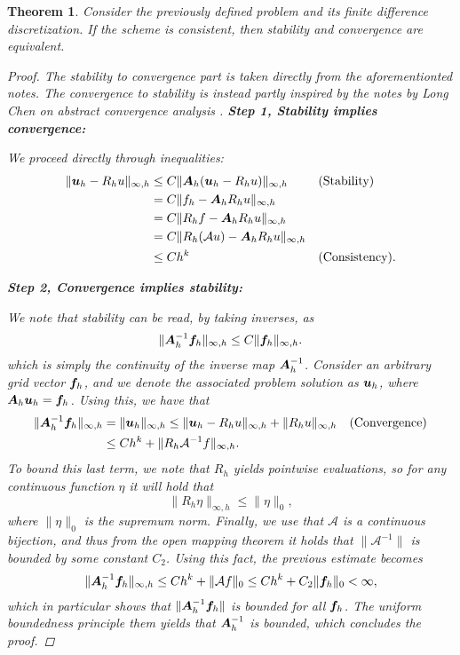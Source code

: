 \documentclass{article}
\renewcommand{\vec}{\vectorsym}
\newcommand{\mat}{\matrixsym}
\newtheorem{theorem}{Theorem}
\begin{document}
\begin{theorem}
    Consider the previously defined problem and its finite difference discretization. If the scheme is consistent, then stability and convergence are equivalent. 
    \begin{proof}
        The stability to convergence part is taken directly from the aforementionted notes. The convergence to stability is instead partly inspired by the notes by Long Chen on abstract convergence analysis \cite{chen2009unified}. 
        {\bf Step 1, Stability implies convergence:}

        We proceed directly through inequalities:
        \begin{align*}
            \| \vec u_h - R_h u\|_{\infty,h} &\leq C\|\mat A_h(\vec u_h - R_hu) \|_{\infty,h} && \text{(Stability)} \\
                                             &=C \| f_h - \mat A_hR_h u \|_{\infty,h} && \\
                                             &=C \| R_h f - \mat A_hR_h u\|_{\infty,h} &&\\
                                             &=C \|R_h(\mathcal A u) - \mat A_hR_h u\|_{\infty,h}&& \\
                                             &\leq Ch^k && \text{(Consistency)}.
        \end{align*}

        {\bf Step 2, Convergence implies stability:}

        We note that stability can be read, by taking inverses, as 
        $$ \| \mat A_h^{-1}\vec f_h \|_{\infty, h} \leq C \|\vec f_h\|_{\infty, h}. $$
        which is simply the continuity of the inverse map $\mat A_h^{-1}$. Consider an arbitrary grid vector $\vec f_h$, and we denote the associated problem solution as $\vec u_h$, where $\mat A_h \vec u_h = \vec f_h$. Using this, we have that
        $$ 
        \begin{aligned} 
            \|\mat A_h^{-1}\vec f_h\|_{\infty,h} &= \| \vec u_h \|_{\infty, h} \leq \| \vec u_h - R_h u \|_{\infty, h} + \| R_h u \|_{\infty, h} && \text{(Convergence)}\\
                                                 &\leq C h^k + \| R_h \mathcal A^{-1} f \|_{\infty, h}. 
        \end{aligned}
        $$
        To bound this last term, we note that $R_h$ yields pointwise evaluations, so for any continuous function $\eta$ it will hold that
        $$ \| R_h \eta \|_{\infty,h} \leq \| \eta \|_0, $$
        where $\| \eta \|_0$ is the supremum norm. Finally, we use that $\mathcal A$ is a continuous bijection, and thus from the open mapping theorem it holds that $\|\mathcal A^{-1}\|$ is bounded by some constant $C_2$. Using this fact, the previous estimate becomes 
        $$ \| \mat A_h^{-1} \vec f_h \|_{\infty,h} \leq Ch^k + \| \mathcal A f \|_0 \leq C h^k + C_2 \| \vec f_h \|_0<\infty, $$
        which in particular shows that $ \| \mat A_h^{-1} \vec f_h \|$ is bounded for all $\vec f_h$. The uniform boundedness principle them yields that $\mat A_h^{-1}$ is bounded, which concludes the proof.
    \end{proof}
\end{theorem}
\end{document}
